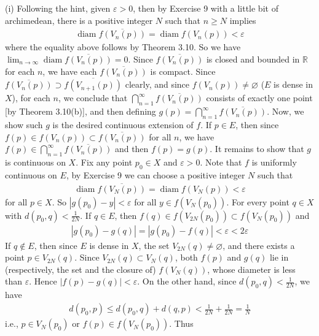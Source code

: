 \documentclass[12pt]{article}
\theoremstyle{definition}
\begin{document}
(i) Following the hint, given $\varepsilon>0$, then by Exercise 9 with a little bit of archimedean, there is a positive integer $N$ such that $n\ge N$ implies
\begin{align*}
\operatorname{diam}\overline{f(V_n(p))}=\operatorname{diam}f(V_n(p))<\varepsilon
\end{align*}
where the equality above follows by Theorem 3.10. So we have $\lim_{n\to\infty}\operatorname{diam}\overline{f(V_n(p))}=0$. Since $\overline{f(V_n(p))}$ is closed and bounded in $\mathbb{R}$ for each $n$, we have each $\overline{f(V_n(p))}$ is compact. Since $\overline{f(V_n(p))}\supset\overline{f(V_{n+1}(p))}$ clearly, and since $f(V_n(p))\ne\varnothing$ ($E$ is dense in $X$), for each $n$, we conclude that $\bigcap_{n=1}^\infty\overline{f(V_n(p))}$ consists of exactly one point [by Theorem 3.10(b)], and then defining $g(p)=\bigcap_{n=1}^\infty\overline{f(V_n(p))}$. Now, we show such $g$ is the desired continuous extension of $f$. If $p\in E$, then since $f(p)\in f(V_n(p))\subset\overline{f(V_n(p))}$ for all $n$, we have $f(p)\in\bigcap_{n=1}^\infty\overline{f(V_n(p))}$ and then $f(p)=g(p)$. It remains to show that $g$ is continuous on $X$. Fix any point $p_0\in X$ and $\varepsilon>0$. Note that $f$ is uniformly continuous on $E$, by Exercise 9 we can choose a positive integer $N$ such that 
\begin{align*}
\operatorname{diam}\overline{f(V_{N}(p))}
=\operatorname{diam}f(V_{N}(p))
<\varepsilon
\end{align*}
for all $p\in X$. So $\left\vert g(p_0)-y\right\vert<\varepsilon$ for all $y\in f(V_{N}(p_0))$. For every point $q\in X$ with $d(p_0,q)<\frac{1}{2N}$. If $q\in E$, then $f(q)\in f(V_{2N}(p_0))\subset f(V_{N}(p_0))$ and
\begin{align*}
\left\vert g(p_0)-g(q)\right\vert
=\left\vert g(p_0)-f(q)\right\vert
<\varepsilon
<2\varepsilon
\end{align*}
If $q\notin E$, then since $E$ is dense in $X$, the set $V_{2N}(q)\ne\varnothing$, and there exists a point $p\in V_{2N}(q)$. Since $V_{2N}(q)\subset V_N(q)$, both $f(p)$ and $g(q)$ lie in (respectively, the set and the closure of) $f(V_N(q))$, whose diameter is less than $\varepsilon$. Hence $\left\vert f(p)-g(q)\right\vert<\varepsilon$. On the other hand, since $d(p_0,q)<\frac{1}{2N}$, we have
\begin{align*}
d(p_0,p)\le d(p_0,q)+d(q,p)<\frac{1}{2N}+\frac{1}{2N}=\frac{1}{N}
\end{align*}
i.e., $p\in V_N(p_0)$ or $f(p)\in f(V_{N}(p_0))$. Thus
\end{document}
